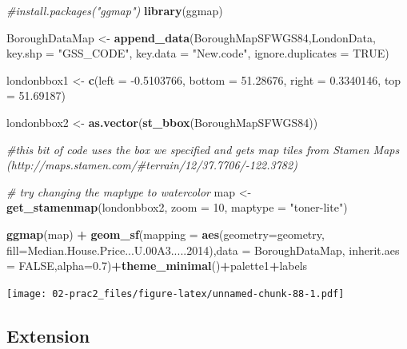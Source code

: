\documentclass[]{book}
\newenvironment{Shaded}{\begin{snugshade}}{\end{snugshade}}
\newcommand{\CommentTok}[1]{\textcolor[rgb]{0.56,0.35,0.01}{\textit{#1}}}
\newcommand{\DataTypeTok}[1]{\textcolor[rgb]{0.13,0.29,0.53}{#1}}
\newcommand{\DecValTok}[1]{\textcolor[rgb]{0.00,0.00,0.81}{#1}}
\newcommand{\FloatTok}[1]{\textcolor[rgb]{0.00,0.00,0.81}{#1}}
\newcommand{\KeywordTok}[1]{\textcolor[rgb]{0.13,0.29,0.53}{\textbf{#1}}}
\newcommand{\NormalTok}[1]{#1}
\newcommand{\OperatorTok}[1]{\textcolor[rgb]{0.81,0.36,0.00}{\textbf{#1}}}
\newcommand{\OtherTok}[1]{\textcolor[rgb]{0.56,0.35,0.01}{#1}}
\newcommand{\StringTok}[1]{\textcolor[rgb]{0.31,0.60,0.02}{#1}}
\begin{document}
\begin{Shaded}
\begin{Highlighting}[]
\CommentTok{#install.packages("ggmap")}
\KeywordTok{library}\NormalTok{(ggmap)}

\NormalTok{BoroughDataMap <-}\StringTok{ }\KeywordTok{append_data}\NormalTok{(BoroughMapSFWGS84,LondonData, }\DataTypeTok{key.shp =} \StringTok{"GSS_CODE"}\NormalTok{, }\DataTypeTok{key.data =} \StringTok{"New.code"}\NormalTok{, }\DataTypeTok{ignore.duplicates =} \OtherTok{TRUE}\NormalTok{)}

\NormalTok{londonbbox1 <-}\StringTok{ }\KeywordTok{c}\NormalTok{(}\DataTypeTok{left =} \FloatTok{-0.5103766}\NormalTok{, }\DataTypeTok{bottom =} \FloatTok{51.28676}\NormalTok{, }\DataTypeTok{right =} \FloatTok{0.3340146}\NormalTok{, }\DataTypeTok{top =} \FloatTok{51.69187}\NormalTok{)}

\NormalTok{londonbbox2 <-}\StringTok{ }\KeywordTok{as.vector}\NormalTok{(}\KeywordTok{st_bbox}\NormalTok{(BoroughMapSFWGS84))}

\CommentTok{#this bit of code uses the box we specified and gets map tiles from Stamen Maps (http://maps.stamen.com/#terrain/12/37.7706/-122.3782)}

\CommentTok{# try changing the maptype to watercolor}
\NormalTok{map <-}\StringTok{ }\KeywordTok{get_stamenmap}\NormalTok{(londonbbox2, }\DataTypeTok{zoom =} \DecValTok{10}\NormalTok{, }\DataTypeTok{maptype =} \StringTok{"toner-lite"}\NormalTok{)}

\KeywordTok{ggmap}\NormalTok{(map) }\OperatorTok{+}\StringTok{ }\KeywordTok{geom_sf}\NormalTok{(}\DataTypeTok{mapping =} \KeywordTok{aes}\NormalTok{(}\DataTypeTok{geometry=}\NormalTok{geometry, }\DataTypeTok{fill=}\NormalTok{Median.House.Price...U}\FloatTok{.00}\NormalTok{A3.....}\DecValTok{2014}\NormalTok{),}\DataTypeTok{data =}\NormalTok{ BoroughDataMap, }\DataTypeTok{inherit.aes =} \OtherTok{FALSE}\NormalTok{,}\DataTypeTok{alpha=}\FloatTok{0.7}\NormalTok{)}\OperatorTok{+}\KeywordTok{theme_minimal}\NormalTok{()}\OperatorTok{+}\NormalTok{palette1}\OperatorTok{+}\NormalTok{labels}
\end{Highlighting}
\end{Shaded}

\texttt{[image: 02-prac2\_files/figure-latex/unnamed-chunk-88-1.pdf]}

\hypertarget{extension}{%
\subsection{Extension}\label{extension}}
\end{document}
